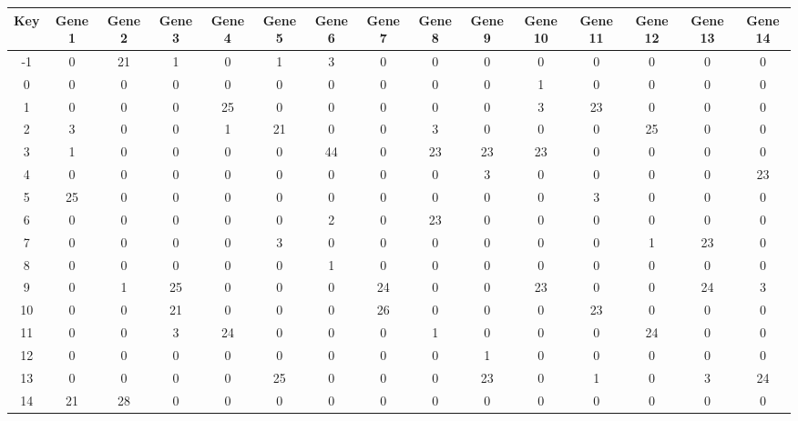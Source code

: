 \begin{tabular}{|c|c|c|c|c|c|c|c|c|c|c|c|c|c|c|}
\hline
Key & Gene 1 & Gene 2 & Gene 3 & Gene 4 & Gene 5 & Gene 6 & Gene 7 & Gene 8 & Gene 9 & Gene 10 & Gene 11 & Gene 12 & Gene 13 & Gene 14 \\
\hline
-1 & 0 & 21 & 1 & 0 & 1 & 3 & 0 & 0 & 0 & 0 & 0 & 0 & 0 & 0 \\
0 & 0 & 0 & 0 & 0 & 0 & 0 & 0 & 0 & 0 & 1 & 0 & 0 & 0 & 0 \\
1 & 0 & 0 & 0 & 25 & 0 & 0 & 0 & 0 & 0 & 3 & 23 & 0 & 0 & 0 \\
2 & 3 & 0 & 0 & 1 & 21 & 0 & 0 & 3 & 0 & 0 & 0 & 25 & 0 & 0 \\
3 & 1 & 0 & 0 & 0 & 0 & 44 & 0 & 23 & 23 & 23 & 0 & 0 & 0 & 0 \\
4 & 0 & 0 & 0 & 0 & 0 & 0 & 0 & 0 & 3 & 0 & 0 & 0 & 0 & 23 \\
5 & 25 & 0 & 0 & 0 & 0 & 0 & 0 & 0 & 0 & 0 & 3 & 0 & 0 & 0 \\
6 & 0 & 0 & 0 & 0 & 0 & 2 & 0 & 23 & 0 & 0 & 0 & 0 & 0 & 0 \\
7 & 0 & 0 & 0 & 0 & 3 & 0 & 0 & 0 & 0 & 0 & 0 & 1 & 23 & 0 \\
8 & 0 & 0 & 0 & 0 & 0 & 1 & 0 & 0 & 0 & 0 & 0 & 0 & 0 & 0 \\
9 & 0 & 1 & 25 & 0 & 0 & 0 & 24 & 0 & 0 & 23 & 0 & 0 & 24 & 3 \\
10 & 0 & 0 & 21 & 0 & 0 & 0 & 26 & 0 & 0 & 0 & 23 & 0 & 0 & 0 \\
11 & 0 & 0 & 3 & 24 & 0 & 0 & 0 & 1 & 0 & 0 & 0 & 24 & 0 & 0 \\
12 & 0 & 0 & 0 & 0 & 0 & 0 & 0 & 0 & 1 & 0 & 0 & 0 & 0 & 0 \\
13 & 0 & 0 & 0 & 0 & 25 & 0 & 0 & 0 & 23 & 0 & 1 & 0 & 3 & 24 \\
14 & 21 & 28 & 0 & 0 & 0 & 0 & 0 & 0 & 0 & 0 & 0 & 0 & 0 & 0 \\
\hline
\end{tabular}